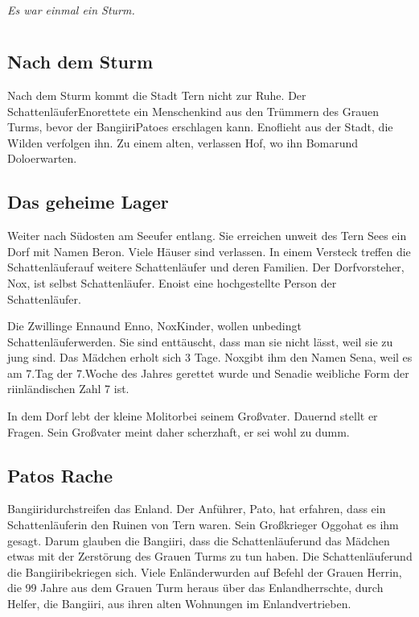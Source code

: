 \documentclass[12pt,a4paper,onecolumn,twoside,ngerman]{book}
\newcommand{\Tern}{Tern }
\newcommand{\Beron}{Beron}
\newcommand{\Molitor}{Molitor}
\newcommand{\Sena}{Sena}
\newcommand{\Bangiri}{Bangiiri}
\newcommand{\Pato}{Pato}
\newcommand{\Oggo}{Oggo}
\newcommand{\Enland}{Enland}
\newcommand{\Enlaender}{Enländer}
\newcommand{\Schattenlaufer}{Schattenläufer}
\newcommand{\Eno}{Eno}
\newcommand{\Bomar}{Bomar}
\newcommand{\Dolo}{Dolo}
\newcommand{\Nox}{Nox}
\newcommand{\Enna}{Enna}
\newcommand{\Enno}{Enno}
\begin{document}
  
  
  
  \tableofcontents
  


\paragraph{}
\textit{Es war einmal ein Sturm.}

\chapter{}
\section{Nach dem Sturm}
Nach dem Sturm kommt die Stadt \Tern  nicht zur Ruhe.
Der \Schattenlaufer  \Eno  rettete ein Menschenkind aus den Trümmern des Grauen Turms, bevor der \Bangiri \Pato es erschlagen kann. \Eno  flieht aus der Stadt, die Wilden verfolgen ihn. Zu einem alten, verlassen Hof, wo ihn \Bomar  und \Dolo  erwarten. 

\section{Das geheime Lager}
Weiter nach Südosten am Seeufer entlang. Sie erreichen unweit des \Tern  Sees ein Dorf mit Namen \Beron  . Viele Häuser sind verlassen. In einem Versteck treffen die \Schattenlaufer  auf weitere \Schattenlaufer  
  und deren Familien. Der Dorfvorsteher, \Nox , ist selbst \Schattenlaufer . \Eno  ist eine hochgestellte Person der \Schattenlaufer .
 
Die Zwillinge \Enna  und \Enno , \Nox  Kinder, wollen unbedingt \Schattenlaufer  werden. Sie sind enttäuscht, dass man sie nicht lässt, weil sie zu jung sind. Das Mädchen erholt sich 3 Tage. \Nox gibt ihm den Namen \Sena , weil es am 7.Tag der 7.Woche des Jahres gerettet wurde und \Sena  die weibliche Form der riinländischen Zahl 7 ist.

In dem Dorf lebt der kleine \Molitor  bei seinem Großvater. Dauernd stellt er Fragen. Sein Großvater meint daher scherzhaft, er sei wohl zu dumm.

\section{\Pato{s} Rache}
\Bangiri  durchstreifen das \Enland . Der Anführer, \Pato , hat erfahren, dass ein \Schattenlaufer in den Ruinen von \Tern waren. Sein Großkrieger \Oggo  hat es ihm gesagt. Darum glauben die \Bangiri , dass die \Schattenlaufer  und das Mädchen etwas mit der Zerstörung des Grauen Turms zu tun haben. Die \Schattenlaufer  und die \Bangiri  bekriegen sich. Viele \Enlaender  wurden auf Befehl der Grauen Herrin, die 99 Jahre aus dem Grauen Turm heraus über das \Enland  herrschte, durch Helfer, die \Bangiri , aus ihren alten Wohnungen im \Enland vertrieben.
 
\end{document}
